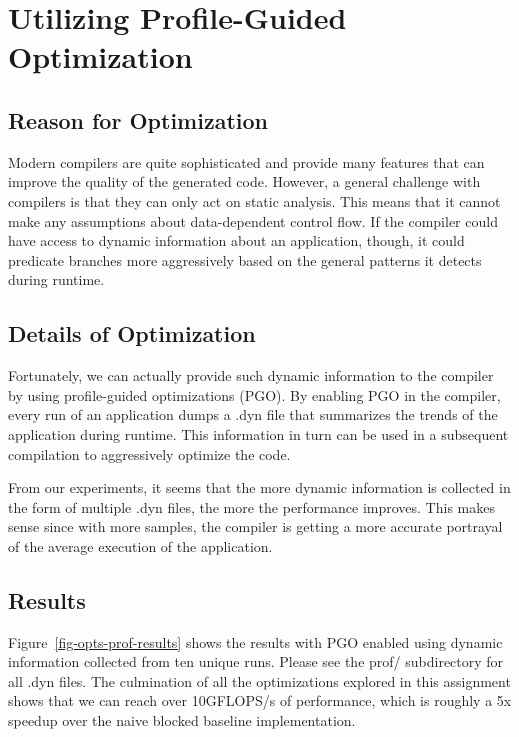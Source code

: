 
\section{Utilizing Profile-Guided Optimization}
\label{sec-opts-prof}

\subsection{Reason for Optimization}

Modern compilers are quite sophisticated and provide many features that
can improve the quality of the generated code. However, a general
challenge with compilers is that they can only act on static
analysis. This means that it cannot make any assumptions about
data-dependent control flow. If the compiler could have access to dynamic
information about an application, though, it could predicate branches
more aggressively based on the general patterns it detects during
runtime.
\smallskip

\subsection{Details of Optimization}

Fortunately, we can actually provide such dynamic information to the
compiler by using profile-guided optimizations (PGO). By enabling PGO in
the compiler, every run of an application dumps a .dyn file that
summarizes the trends of the application during runtime. This information
in turn can be used in a subsequent compilation to aggressively optimize
the code.
\smallskip

From our experiments, it seems that the more dynamic information is
collected in the form of multiple .dyn files, the more the performance
improves. This makes sense since with more samples, the compiler is
getting a more accurate portrayal of the average execution of the
application.
\smallskip

\subsection{Results}



Figure~\ref{fig-opts-prof-results} shows the results with PGO enabled
using dynamic information collected from ten unique runs. Please see the
prof/ subdirectory for all .dyn files. The culmination
of all the optimizations explored in this assignment shows that we can
reach over 10GFLOPS/s of performance, which is roughly a 5x speedup over
the naive blocked baseline implementation.
